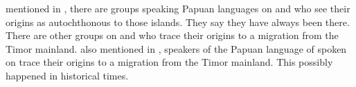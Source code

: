  mentioned in ,
there are groups speaking Papuan languages on 
and  who see their origins as autochthonous to those islands.
They say they have always been there.
There are other groups on 
and  who trace their origins to a migration from the Timor mainland.
 also mentioned in ,
speakers of the Papuan language of  spoken on  trace
their origins to a migration from the Timor mainland.
This possibly happened in historical times.